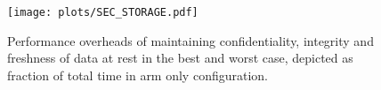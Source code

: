 \begin{figure}[t]
	\centering
	\texttt{[image: plots/SEC\_STORAGE.pdf]}
	\caption{\label{fig:sec-store} Performance overheads of maintaining confidentiality, integrity and freshness of data at rest in the best and worst case, depicted as fraction of total time in arm only configuration.}
\end{figure}